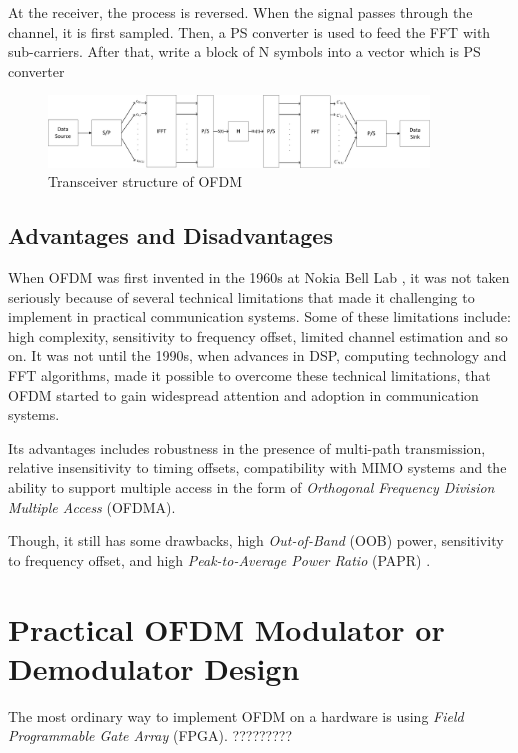 \documentclass[11pt]{article}
\numberwithin{figure}{section}
\numberwithin{equation}{section}
\begin{document}
At the receiver, the process is reversed. When the signal passes through the channel, it is first sampled. Then, a PS converter is used to feed the FFT with sub-carriers. After that, write a block of N symbols into a vector which is PS converter

\begin{figure}[!ht]
  \centering
  \includegraphics[width=0.9\textwidth]{images/OFDM_transceiver.pdf}
  \caption{Transceiver structure of OFDM}
  \label{fig:Transceiver structure}
\end{figure}

\subsection{Advantages and Disadvantages}
When OFDM was first invented in the 1960s at Nokia Bell Lab \cite{RN82}, it was not taken seriously because of several technical limitations that made it challenging to implement in practical communication systems. Some of these limitations include: high complexity, sensitivity to frequency offset, limited channel estimation and so on. It was not until the 1990s, when advances in DSP, computing technology and FFT algorithms, made it possible to overcome these technical limitations, that OFDM started to gain widespread attention and adoption in communication systems. 

Its advantages includes robustness in the presence of multi-path transmission, relative insensitivity to timing offsets, compatibility with MIMO systems and the ability to support multiple access in the form of \textit{Orthogonal Frequency Division Multiple Access} (OFDMA). 

Though, it still has some drawbacks, high \textit{Out-of-Band} (OOB) power, sensitivity to frequency offset, and high \textit{Peak-to-Average Power Ratio} (PAPR) \cite{RN81}.

\section{Practical OFDM Modulator or Demodulator Design}
The most ordinary way to implement OFDM on a hardware is using \textit{Field Programmable Gate Array} (FPGA).
?????????
\end{document}
